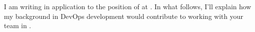 I am writing in application to the position of \position{} at \companyname{}. In what follows, I'll explain how my background in DevOps development would contribute to working with your team in \city{}. 